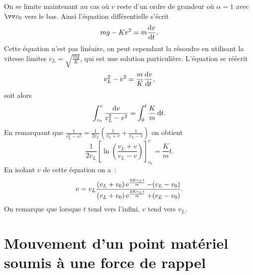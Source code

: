 On se limite maintenant au cas où $v$ reste d'un ordre de grandeur où $\alpha=1$ avec $\vvv_0$ vers le bas. Ainsi l'équation différentielle s'écrit
\begin{equation}
  mg -Kv^2 = m\dfrac{\mathrm{d} v}{\mathrm{d} t}.
\end{equation}
Cette équation n'est pas linéaire, on peut cependant la résoudre en utilisant la vitesse limites $v_L = \sqrt{\frac{mg}{K}}$, qui est une solution particulière. L'équation se réécrit
\begin{equation}
  v_L^2-v^2 = \frac{m}{K}\dfrac{\mathrm{d} v}{\mathrm{d} t},
\end{equation}
soit alors
\begin{equation}
  \int_{v_0}^v \frac{\mathop{}\mathopen{}\mathrm{d} v}{v_L^2-v^2} = \int_0^t\frac{K}{m}\mathop{}\mathopen{}\mathrm{d} t.
\end{equation}
En remarquant que $\frac{1}{v_L^2-v^2} = \frac{1}{2 v_L}\left(\frac{1}{v_L+v}+\frac{1}{v_L-v}\right)$ on obtient
\begin{equation}
  \frac{1}{2v_L}\left[\ln\left(\frac{v_L+v}{v_L-v}\right)\right]^{v}_{v_0} = \frac{K}{m}t.
\end{equation}
En isolant $v$ de cette équation on a~:
\begin{equation}
  v = v_L \frac{(v_L+v_0)\operatorname{e}^{\frac{2K v_L t}{m}}-(v_L-v_0)}{(v_L+v_0)\operatorname{e}^{\frac{2K v_L t}{m}}+(v_L-v_0)}.
\end{equation}
On remarque que lorsque $t$ tend vers l'infini, $v$ tend vers $v_L$.
\section{Mouvement d'un point matériel soumis à une force de rappel}
\label{chap3-sec:mouvementdunpointmaterielsoumisauneforcederappel}
